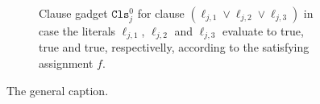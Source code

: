 \begin{figure}
\begin{subfigure}[b]{\textwidth}
    \caption{%
    Clause gadget $\texttt{Cls}^{0}_{j}$ for clause $(\ell_{j,1} \vee \ell_{j,2} \vee \ell_{j,3})$
    in case the literals $\ell_{j,1}$, $\ell_{j,2}$ and $\ell_{j,3}$ evaluate to true, true and true,
    respectivelly, according to the satisfying assignment $f$.
    }%
  \end{subfigure}
  \caption{The general caption.}
\end{figure}
